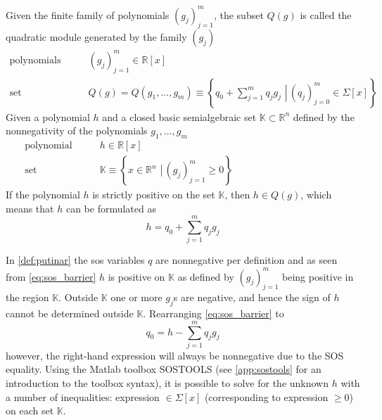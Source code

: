  

\begin{exa}\label{def:putinar}
Given the finite family of polynomials $(g_j)_{j=1}^m$, the subset $Q(g)$ is called the quadratic module generated by the family $(g_j)$ \citep[p 29]{bib:sos_putinar_lasserre}
\begin{subequations}\label{eq:putinar}
\begin{align}
\text{polynomials} \qquad & (g_j)_{j=1}^m \in\mathbb{R}[x]\\
\text{set} \qquad & Q(g)=Q(g_1,...,g_m)\equiv\left\{\left.q_0+\sum\limits_{j=1}^{m}q_jg_j\,\,\right| \, (q_j)_{j=0}^m\in\Sigma[x]\right\}
\end{align}
\end{subequations}
Given a polynomial $h$ and a closed basic semialgebraic set $\mathbb{K}\subset\mathbb{R}^n$ defined by the nonnegativity of the polynomials $g_1,\dots, g_m$  
\begin{subequations}
\begin{align}
\text{polynomial} \qquad & h \in\mathbb{R}[x]\\
\text{set} \qquad & \mathbb{K}\equiv\left\{\left.x\in \mathbb{R}^n\,\, \right| \, (g_j)_{j=1}^m\geq0\right\}\qquad\qquad\qquad\qquad\qquad\quad
\end{align}
\end{subequations}
If the polynomial $h$ is strictly positive on the set $\mathbb{K}$, then $h\in Q(g)$, which means that $h$  can be formulated as
\begin{equation}\label{eq:sos_barrier}
h = q_0+\sum\limits_{j=1}^{m}q_jg_j
\end{equation}
\end{exa}





In \autoref{def:putinar} the \gls{sos} variables $q$ are nonnegative per definition and as seen from \autoref{eq:sos_barrier} $h$ is positive on $\mathbb{K}$ as defined by $(g_j)_{j=1}^m$ being positive  in the region $\mathbb{K}$. Outside $\mathbb{K}$ one or more $g_j$s are negative, and hence the sign of $h$ cannot be determined outside $\mathbb{K}$.
Rearranging \autoref{eq:sos_barrier} to
\begin{equation}
q_0 = h - \sum _{j=1}^{m}q_jg_j \label{eq:putinar_sos}
\end{equation} 
however, the right-hand expression will always be nonnegative due to the SOS equality. Using the Matlab toolbox SOSTOOLS (see \autoref{app:sostools} for an introduction to the toolbox syntax), it is possible to solve for the unknown $h$ with a number of inequalities: expression $\in\Sigma[x]$ (corresponding to expression $\geq 0$) on each set $\mathbb{K}$. 

